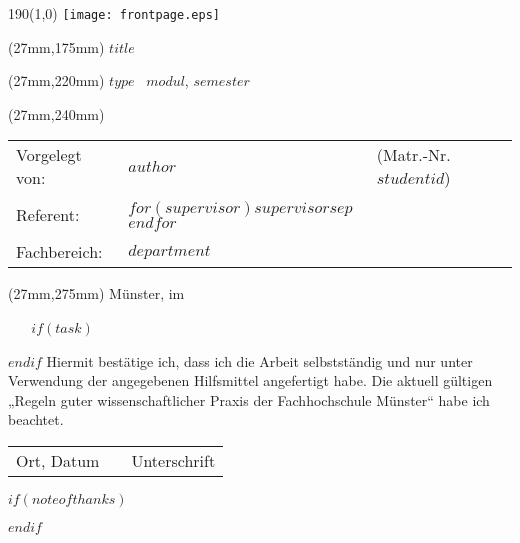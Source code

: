 \documentclass[11 pt,bibliography=totoc,listof=totoc,twoside,open=right]{scrreprt}
\begin{document}
\begin{titlepage}
\begin{textblock}{190}(1,0)
	\texttt{[image: frontpage.eps]}
\end{textblock}
\doublespacing
\begin{textblock*}{156mm}(27mm,175mm)
	\LARGE \textbf{$title$}
\end{textblock*}
\singlespacing
\begin{textblock*}{156mm}(27mm,220mm)
	\Large $type$ \ \textbf{$modul$}, $semester$
\end{textblock*}
\begin{textblock*}{156mm}(27mm,240mm)
	\normalsize
	\begin{tabularx}{120mm}{l X l}
		Vorgelegt von:&\textbf{$author$}&(Matr.-Nr. $studentid$)\\
		&&\\
		Referent:&\textbf{$for(supervisor)$$supervisor$$sep$ \newline $endfor$}\\
		&&\\
		Fachbereich:&\textbf{$department$}\\
	\end{tabularx}
\end{textblock*}
\begin{textblock*}{156mm}(27mm,275mm)
	Münster, im \makeatletter \month@ngerman \makeatother \ \the\year
\end{textblock*}
\end{titlepage}
\clearpage
\newpage \
\newpage \thispagestyle{empty}
\mbox{~}
\clearpage
\newpage
\thispagestyle{empty}
$if(task)$

$endif$
\newpage
\thispagestyle{empty}
\vspace*{10mm}
\normalsize
\doublespacing
Hiermit bestätige ich, dass ich die Arbeit selbstständig und nur unter Verwendung der angegebenen Hilfsmittel angefertigt habe. Die aktuell gültigen „Regeln guter wissenschaftlicher Praxis der Fachhochschule Münster“ habe ich beachtet.
\vspace{20mm}
\hspace{-1cm}
\begin{table}[h]
	\centering
	\begin{tabular}{p{50mm}p{50mm}p{50mm}}
		Ort, Datum& &Unterschrift
	\end{tabular}
\end{table}
\onehalfspacing
$if(noteofthanks)$
{}
\thispagestyle{empty}

$endif$
\end{document}
